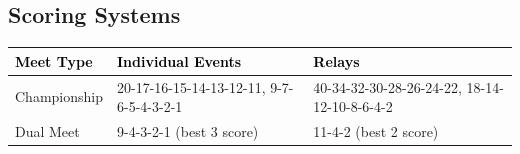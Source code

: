 









\subsection*{Scoring Systems}

\begin{table}[H]
\centering
\renewcommand{\arraystretch}{1.4}
\begin{tabular}{p{3.5cm} p{5cm} p{5.5cm}}
\toprule
\rowcolor{teamprimary!25}
\textbf{\textcolor{black}{Meet Type}} & \textbf{\textcolor{black}{Individual Events}} & \textbf{\textcolor{black}{Relays}} \\
\midrule
\rowcolor{teamsecondary!15}
Championship & 20-17-16-15-14-13-12-11, 9-7-6-5-4-3-2-1 & 40-34-32-30-28-26-24-22, 18-14-12-10-8-6-4-2 \\
\rowcolor{teamprimary!10}
Dual Meet & 9-4-3-2-1 (best 3 score) & 11-4-2 (best 2 score) \\
\bottomrule
\end{tabular}
\end{table}

